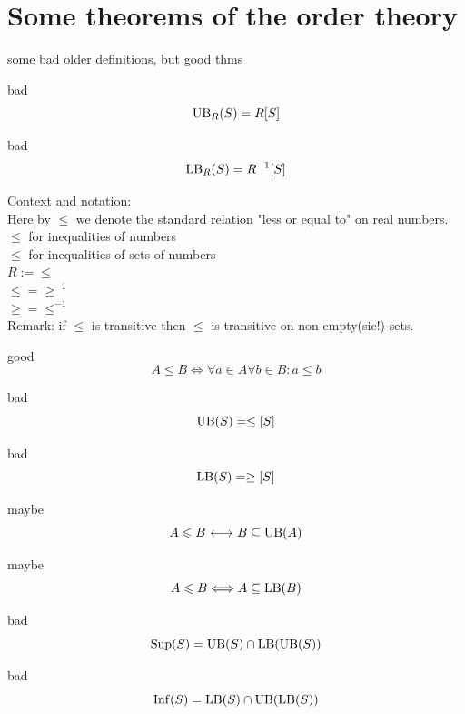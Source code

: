 \section{Some theorems of the order theory}
some bad older definitions, but good thms
\begin{definition}bad
\[
\mathrm{UB}_R(S) = R[S]
\]
\end{definition}
\begin{definition}bad
\[\mathrm{LB}_R(S) = R^{-1}[S]\]
\end{definition}

Context and notation:\\
Here by $\leq$ we denote the standard relation "less or equal to" on real numbers.
$\leq$ for inequalities of numbers\\
$\leqslant$ for inequalities of sets of numbers\\
$R := \leq$\\
$\leq = \geq^{-1}$\\
$\geq = \leq^{-1}$\\
Remark: if $\leq$ is transitive then $\leqslant$ is transitive on non-empty(sic!) sets.
\noindent

\begin{definition}good
\[
A \leqslant B
\iff
\forall a\in A \forall b\in B: a\leq b
\]
\end{definition}
\begin{definition}bad
\[
\mathrm{UB}(S) = \leq [S]
\]
\end{definition}
\begin{definition}bad
\[
\mathrm{LB}(S) = \geq [S]
\]
\end{definition}

\begin{theorem}maybe
\[
A\leqslant B {\ \longleftrightarrow\ } B\subseteq \mathrm{UB}(A)
\]
\end{theorem}
\begin{theorem}maybe
\[
A\leqslant B \Longleftrightarrow A\subseteq \mathrm{LB}(B)
\]
\end{theorem}

\begin{definition}bad
\[
\mathrm{Sup}(S) = \mathrm{UB}(S)\cap \mathrm{LB}(\mathrm{UB}(S))
\]
\end{definition}
\begin{definition}bad
\[
\mathrm{Inf}(S) = \mathrm{LB}(S)\cap \mathrm{UB}(\mathrm{LB}(S))
\]
\end{definition}



